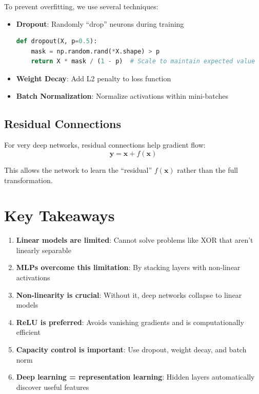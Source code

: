 \documentclass{article}
\begin{document}
To prevent overfitting, we use several techniques:

\begin{itemize}
    \item \textbf{Dropout}: Randomly ``drop'' neurons during training
    \begin{lstlisting}[language=Python]
def dropout(X, p=0.5):
    mask = np.random.rand(*X.shape) > p
    return X * mask / (1 - p)  # Scale to maintain expected value
    \end{lstlisting}
    
    \item \textbf{Weight Decay}: Add L2 penalty to loss function
    \item \textbf{Batch Normalization}: Normalize activations within mini-batches
\end{itemize}

\subsection{Residual Connections}

For very deep networks, residual connections help gradient flow:
\[\mathbf{y} = \mathbf{x} + f(\mathbf{x})\]

This allows the network to learn the ``residual'' $f(\mathbf{x})$ rather than the full transformation.

\section{Key Takeaways}

\begin{enumerate}
    \item \textbf{Linear models are limited}: Cannot solve problems like XOR that aren't linearly separable
    \item \textbf{MLPs overcome this limitation}: By stacking layers with non-linear activations
    \item \textbf{Non-linearity is crucial}: Without it, deep networks collapse to linear models
    \item \textbf{ReLU is preferred}: Avoids vanishing gradients and is computationally efficient
    \item \textbf{Capacity control is important}: Use dropout, weight decay, and batch norm
    \item \textbf{Deep learning = representation learning}: Hidden layers automatically discover useful features
\end{enumerate}
\end{document}
